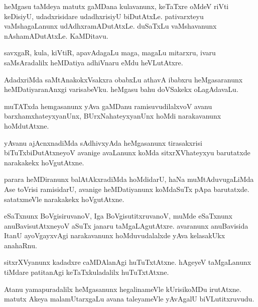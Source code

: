 \documentclass{article}
\begin{document}
\begin{mng}%
heMgasu taMdeya matutx gaMDana kulavanunx, keTaTxre oMdeV
riVti keDisiyU, udadxrisidare udadhxrisiyU biDutAtxLe. pativarxteyu
vaMshagaLanunx udAdhxramADutAtxLe. duSaTxLu vaMshavanunx nAshamADutAtxLe.
KaMDitavu.
\end{mng}

\begin{mng}%
savxgaR, kula, kiVtiR, apavAdagaLu maga, magaLu mitarxru,
ivaru saMsAradalilx heMDatiya adhiVnaru eMdu heVLutAtxre.
\end{mng}

\begin{mng}%
AdadxriMda saMtAnakokxVsakxra obabxLu athavA ibabxru heMgasaranunx
heMDatiyaranAnxgi varisabeVku. heMgasu bahu doVSakekx oLagAdavaLu.
\end{mng}

\begin{mng}%
muTATxda hemgasanunx yAva gaMDanu ramisuvudilalxvoV avanu
barxhamxhateyxyanUnx, BUrxNahateyxyanUnx hoMdi narakavanunx hoMdutAtxne.
\end{mng}

\begin{mng}%
yAvanu ajAcnxnadiMda sAdhivxyAda heMgasanunx tirasakxrisi
biTuTxbiDutAtxneyoV avanige avaLanunx koMda sitxrXVhateyxyu barutatxde
narakakekx hoVgutAtxne.
\end{mng}

\begin{mng}%
parara heMDiranunx balAtAkxradiMda hoMdidarU, haNa
muMtAduvugaLiMda Ase toVrisi ramisidarU, avanige heMDatiyanunx
koMdaSuTx pApa barutatxde. satatxmeVle narakakekx hoVgutAtxne.
\end{mng}

\begin{mng}%
eSaTxnunx BoVgisiruvanoV, Iga BoVgisutitxruvanoV,
muMde eSaTxnunx anuBavisutAtxneyoV aSuTx janaru taMgaLAgutAtxre.
avaranunx anuBavisida ItanU ayoVgayxvAgi narakavanunx hoMduvudalalxde
yAva kelasakUkx anahaRnu.
\end{mng}

\begin{mng}%
sitxrXVyanunx kadadxre caMDAlanAgi huTuTxtAtxne. hAgeyeV
taMgaLanunx tiMdare patitanAgi keTaTxkuladalilx huTuTxtAtxne.
\end{mng}

\begin{mng}%
Atanu yamapuradalilx heMgasanunx hegalinameVle kUrisikoMDu
irutAtxne. matutx Akeya malamUtarxgaLu avana taleyameVle yAvAgalU
biVLutitxruvudu.
\end{mng}
\end{document}
